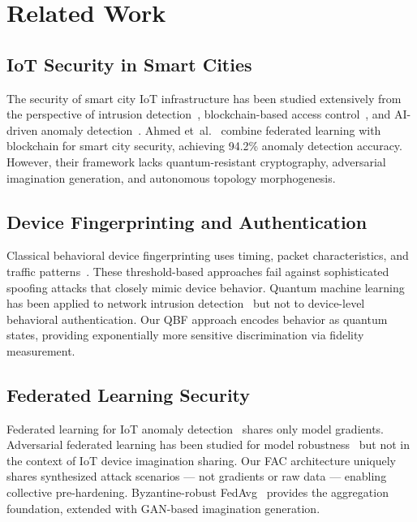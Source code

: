 
\section{Related Work}
\label{sec:related}

\subsection{IoT Security in Smart Cities}

The security of smart city IoT infrastructure has been studied extensively
from the perspective of intrusion detection~\cite{meidan2018n}, blockchain-based
access control~\cite{theodorou2019blockchain}, and AI-driven anomaly
detection~\cite{mdpi2024ai}. Ahmed et~al.~\cite{ahmed2024fl} combine federated
learning with blockchain for smart city security, achieving 94.2\% anomaly
detection accuracy. However, their framework lacks quantum-resistant cryptography,
adversarial imagination generation, and autonomous topology morphogenesis.

\subsection{Device Fingerprinting and Authentication}

Classical behavioral device fingerprinting uses timing, packet characteristics,
and traffic patterns~\cite{radhakrishnan2023iot}. These threshold-based approaches
fail against sophisticated spoofing attacks that closely mimic device behavior.
Quantum machine learning has been applied to network intrusion
detection~\cite{mdpi2025qf} but not to device-level behavioral authentication.
Our QBF approach encodes behavior as quantum states, providing exponentially
more sensitive discrimination via fidelity measurement.

\subsection{Federated Learning Security}

Federated learning for IoT anomaly detection~\cite{aledhari2020federated} shares
only model gradients. Adversarial federated learning has been studied for model
robustness~\cite{goodfellow2014gan} but not in the context of IoT device
imagination sharing. Our FAC architecture uniquely shares synthesized attack
scenarios — not gradients or raw data — enabling collective pre-hardening.
Byzantine-robust FedAvg~\cite{mcmahan2017fedavg} provides the aggregation
foundation, extended with GAN-based imagination generation.


